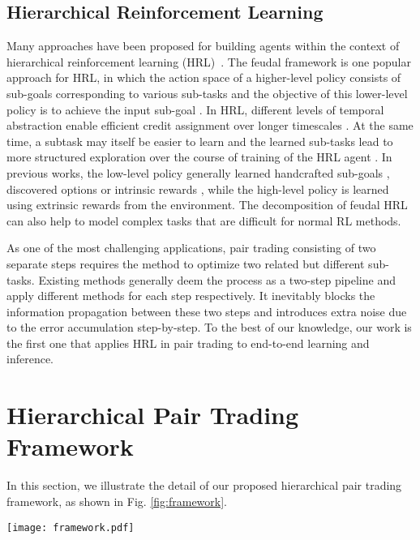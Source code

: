 \documentclass[sigconf]{acmart}
\begin{document}
\subsection{Hierarchical Reinforcement Learning}
Many approaches have been proposed for building agents within the context of hierarchical reinforcement learning (HRL)~\cite{Xie2021HierarchicalRL, Pope2021HierarchicalRL, Saleh2020HierarchicalRL}. The feudal framework is one popular approach for HRL, in which the action space of a higher-level policy consists of sub-goals corresponding to various sub-tasks and the objective of this lower-level policy is to achieve the input sub-goal \cite{NIPS1992_d14220ee}. In HRL, different levels of temporal abstraction enable efficient credit assignment over longer timescales \cite{Vezhnevets2017FeUdalNF}. At the same time, a subtask may itself be easier to learn and the learned sub-tasks lead to more structured exploration over the course of training of the HRL agent \cite{Nachum2019WhyDH}. In previous works, the low-level policy generally learned handcrafted sub-goals \cite{Kulkarni2016HierarchicalDR}, discovered options \cite{Bacon2017TheOA} or intrinsic rewards \cite{Vezhnevets2017FeUdalNF}, while the high-level policy is learned using extrinsic rewards from the environment.
The decomposition of feudal HRL can also help to model complex tasks that are difficult for normal RL methods.

As one of the most challenging applications, pair trading consisting of two separate steps requires the method to optimize two related but different sub-tasks.
Existing methods generally deem the process as a two-step pipeline and apply different methods for each step respectively.
It inevitably blocks the information propagation between these two steps and introduces extra noise due to the error accumulation step-by-step.
To the best of our knowledge, our work is the first one that applies HRL in pair trading to end-to-end learning and inference.
	
\section{Hierarchical Pair Trading Framework}
In this section, we illustrate the detail of our proposed hierarchical pair trading framework, as shown in Fig. \ref{fig:framework}.
\begin{figure*}[htb]
 \centering
 \texttt{[image: framework.pdf]}
 \caption{The hierarchical framework for pair trading.}
 \label{fig:framework}
\end{figure*}
	
\end{document}
